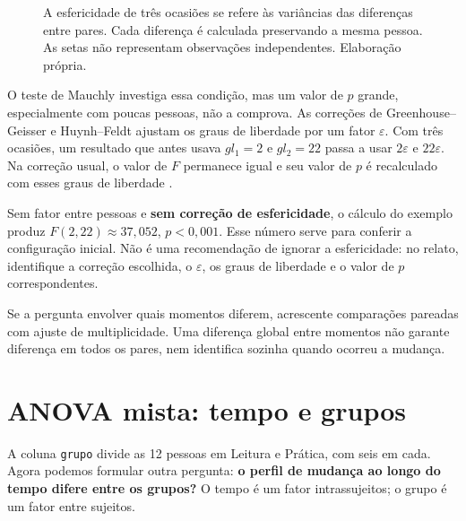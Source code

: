 \begin{figure}[H]
\centering
{}
\caption{A esfericidade de três ocasiões se refere às variâncias das diferenças entre pares. Cada diferença é calculada preservando a mesma pessoa. As setas não representam observações independentes. Elaboração própria.}
\label{fig:esfericidade-diferencas}
\end{figure}

O teste de Mauchly investiga essa condição, mas um valor de $p$ grande, especialmente com poucas pessoas, não a comprova. As correções de Greenhouse--Geisser e Huynh--Feldt ajustam os graus de liberdade por um fator $\varepsilon$. Com três ocasiões, um resultado que antes usava $gl_1=2$ e $gl_2=22$ passa a usar $2\varepsilon$ e $22\varepsilon$. Na correção usual, o valor de $F$ permanece igual e seu valor de $p$ é recalculado com esses graus de liberdade \parencite{JamoviAnovaRM}.

Sem fator entre pessoas e \textbf{sem correção de esfericidade}, o cálculo do exemplo produz $F(2,22)\approx37{,}052$, $p<0{,}001$. Esse número serve para conferir a configuração inicial. Não é uma recomendação de ignorar a esfericidade: no relato, identifique a correção escolhida, o $\varepsilon$, os graus de liberdade e o valor de $p$ correspondentes.

Se a pergunta envolver quais momentos diferem, acrescente comparações pareadas com ajuste de multiplicidade. Uma diferença global entre momentos não garante diferença em todos os pares, nem identifica sozinha quando ocorreu a mudança.

\section{ANOVA mista: tempo e grupos}

A coluna \texttt{grupo} divide as 12 pessoas em Leitura e Prática, com seis em cada. Agora podemos formular outra pergunta: \textbf{o perfil de mudança ao longo do tempo difere entre os grupos?} O tempo é um fator intrassujeitos; o grupo é um fator entre sujeitos.

